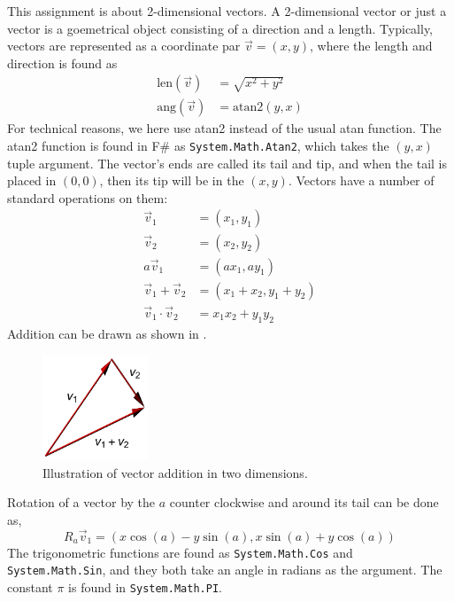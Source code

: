 This assignment is about 2-dimensional vectors. A 2-dimensional vector or just a vector is a goemetrical object consisting of a direction and a length. Typically, vectors are represented as a coordinate par $\vec v  = (x, y)$, where the length and direction is found as
\begin{align}
  \text{len}(\vec v) &= \sqrt{x^2+y^2}
  \\\text{ang}(\vec v) &=\text{atan2}(y, x)
\end{align}
For technical reasons, we here use atan2 instead of the usual atan function. The atan2 function is found in F\# as \lstinline{System.Math.Atan2}, which takes the $(y,x)$ tuple argument. The vector's ends are called its tail and tip, and when the tail is placed in $(0, 0)$, then its tip will be in the  $(x, y)$. Vectors have a number of standard operations on them:
\begin{align}
  \vec v_1 &= (x_1, y_1)
  \\\vec v_2 &= (x_2, y_2)
  \\a \vec v_1 &= (a x_1, a y_1)
  \\\vec v_1 + \vec v_2 &= (x_1+x_2, y_1+y_2)
  \\\vec v_1 \cdot \vec v_2 &= x_1 x_2 +  y_1y_2
\end{align}
Addition can be drawn as shown in .
\begin{figure}
  \centering
  \includegraphics[width=0.28\textwidth]{vectorAddition}
  \caption{Illustration of vector addition in two dimensions.}
  \label{fig:vectorAddition}
\end{figure}
Rotation of a vector by the $a$ counter clockwise and around its tail can be done as,
\begin{equation}
  R_a \vec v_1 = (x\cos(a) - y\sin(a),x\sin(a)+y\cos(a))
\end{equation}
The trigonometric functions are found as \lstinline{System.Math.Cos} and \lstinline{System.Math.Sin}, and they both take an angle in radians as the argument. The constant $\pi$ is found in \lstinline{System.Math.PI}.
